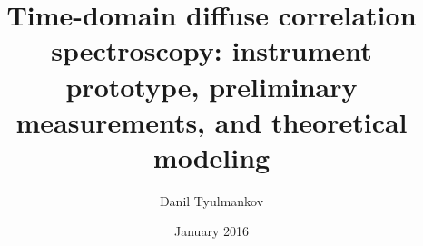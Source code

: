 %

\title{Time-domain diffuse correlation spectroscopy: instrument prototype, preliminary measurements, and theoretical modeling}
\author{Danil Tyulmankov}
\date{January 2016}





%